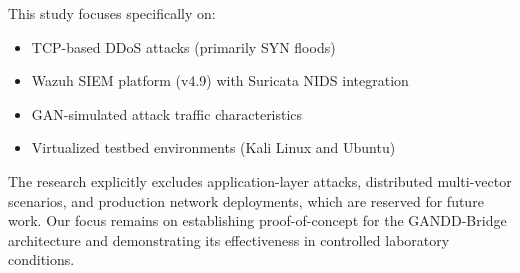 This study focuses specifically on:
\begin{itemize}
    \item TCP-based DDoS attacks (primarily SYN floods)
    \item Wazuh SIEM platform (v4.9) with Suricata NIDS integration
    \item GAN-simulated attack traffic characteristics
    \item Virtualized testbed environments (Kali Linux and Ubuntu)
\end{itemize}

The research explicitly excludes application-layer attacks, distributed multi-vector scenarios, and production network deployments, which are reserved for future work. Our focus remains on establishing proof-of-concept for the GANDD-Bridge architecture and demonstrating its effectiveness in controlled laboratory conditions.